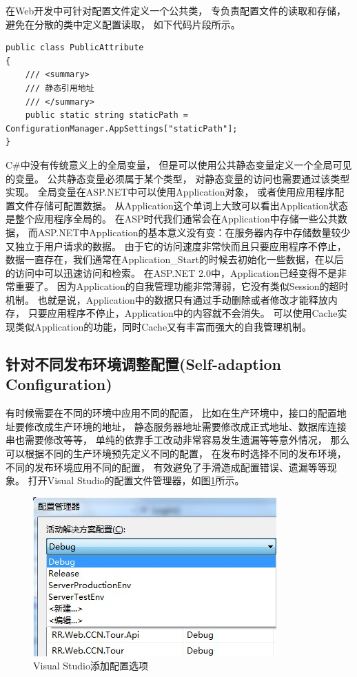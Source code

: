 \documentclass{book}
\begin{document}
在Web开发中可针对配置文件定义一个公共类，
专负责配置文件的读取和存储，
避免在分散的类中定义配置读取，
如下代码片段所示。

\begin{lstlisting}[language={[Sharp]C}]
public class PublicAttribute
{
    /// <summary>
    /// 静态引用地址
    /// </summary>
    public static string staticPath = ConfigurationManager.AppSettings["staticPath"];
}
\end{lstlisting}

C\#中没有传统意义上的全局变量，
但是可以使用公共静态变量定义一个全局可见的变量。
公共静态变量必须属于某个类型，
对静态变量的访问也需要通过该类型实现。
全局变量在ASP.NET中可以使用Application对象，
或者使用应用程序配置文件存储可配置数据。
从Application这个单词上大致可以看出Application状态是整个应用程序全局的。
在ASP时代我们通常会在Application中存储一些公共数据，
而ASP.NET中Application的基本意义没有变：在服务器内存中存储数量较少又独立于用户请求的数据。
由于它的访问速度非常快而且只要应用程序不停止，
数据一直存在，我们通常在Application\_Start的时候去初始化一些数据，在以后的访问中可以迅速访问和检索。
在ASP.NET 2.0中，Application已经变得不是非常重要了。
因为Application的自我管理功能非常薄弱，它没有类似Session的超时机制。
也就是说，Application中的数据只有通过手动删除或者修改才能释放内存，
只要应用程序不停止，Application中的内容就不会消失。
可以使用Cache实现类似Application的功能，同时Cache又有丰富而强大的自我管理机制。

\subsection{针对不同发布环境调整配置(Self-adaption Configuration)}

有时候需要在不同的环境中应用不同的配置，
比如在生产环境中，接口的配置地址要修改成生产环境的地址，
静态服务器地址需要修改成正式地址、数据库连接串也需要修改等等，
单纯的依靠手工改动非常容易发生遗漏等等意外情况，
那么可以根据不同的生产环境预先定义不同的配置，
在发布时选择不同的发布环境，不同的发布环境应用不同的配置，
有效避免了手滑造成配置错误、遗漏等等现象。
打开Visual Studio的配置文件管理器，如图\ref{fig:VisualStudioConfigurationManager}所示。

\begin{figure}[htbp]
	\centering
	\includegraphics[scale=0.8]{VisualStudioConfigurationManager.jpg}
	\caption{Visual Studio添加配置选项}
	\label{fig:VisualStudioConfigurationManager}
\end{figure}
\end{document}
